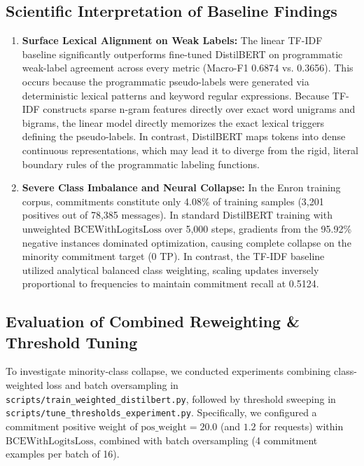 \documentclass[conference]{IEEEtran}
\begin{document}
\subsection{Scientific Interpretation of Baseline Findings}
\begin{enumerate}
    \item \textbf{Surface Lexical Alignment on Weak Labels:} The linear TF-IDF baseline significantly outperforms fine-tuned DistilBERT on programmatic weak-label agreement across every metric (Macro-F1 0.6874 vs. 0.3656). This occurs because the programmatic pseudo-labels were generated via deterministic lexical patterns and keyword regular expressions. Because TF-IDF constructs sparse n-gram features directly over exact word unigrams and bigrams, the linear model directly memorizes the exact lexical triggers defining the pseudo-labels. In contrast, DistilBERT maps tokens into dense continuous representations, which may lead it to diverge from the rigid, literal boundary rules of the programmatic labeling functions.
    \item \textbf{Severe Class Imbalance and Neural Collapse:} In the Enron training corpus, commitments constitute only 4.08\% of training samples (3,201 positives out of 78,385 messages). In standard DistilBERT training with unweighted $\text{BCEWithLogitsLoss}$ over 5,000 steps, gradients from the 95.92\% negative instances dominated optimization, causing complete collapse on the minority commitment target (0 TP). In contrast, the TF-IDF baseline utilized analytical balanced class weighting, scaling updates inversely proportional to frequencies to maintain commitment recall at 0.5124.
\end{enumerate}

\subsection{Evaluation of Combined Reweighting \& Threshold Tuning}
To investigate minority-class collapse, we conducted experiments combining class-weighted loss and batch oversampling in \texttt{scripts/train\_weighted\_distilbert.py}, followed by threshold sweeping in \texttt{scripts/tune\_thresholds\_experiment.py}. Specifically, we configured a commitment positive weight of $\text{pos\_weight} = 20.0$ (and $1.2$ for requests) within $\text{BCEWithLogitsLoss}$, combined with batch oversampling (4 commitment examples per batch of 16).
\end{document}
